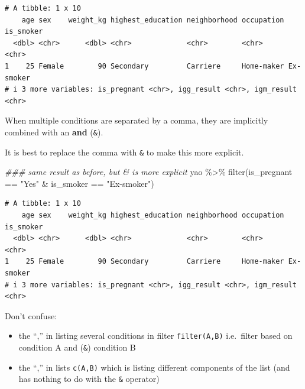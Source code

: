 \documentclass[
  letterpaper,
  DIV=11,
  numbers=noendperiod]{scrreprt}
\newenvironment{Shaded}{\begin{snugshade}}{\end{snugshade}}
\newcommand{\DocumentationTok}[1]{\textcolor[rgb]{0.37,0.37,0.37}{\textit{#1}}}
\newcommand{\FunctionTok}[1]{\textcolor[rgb]{0.28,0.35,0.67}{#1}}
\newcommand{\NormalTok}[1]{\textcolor[rgb]{0.00,0.23,0.31}{#1}}
\newcommand{\SpecialCharTok}[1]{\textcolor[rgb]{0.37,0.37,0.37}{#1}}
\newcommand{\StringTok}[1]{\textcolor[rgb]{0.13,0.47,0.30}{#1}}
\begin{document}
\begin{verbatim}
# A tibble: 1 x 10
    age sex    weight_kg highest_education neighborhood occupation is_smoker
  <dbl> <chr>      <dbl> <chr>             <chr>        <chr>      <chr>    
1    25 Female        90 Secondary         Carriere     Home-maker Ex-smoker
# i 3 more variables: is_pregnant <chr>, igg_result <chr>, igm_result <chr>
\end{verbatim}

When multiple conditions are separated by a comma, they are implicitly
combined with an \textbf{and} (\texttt{\&}).

It is best to replace the comma with \texttt{\&} to make this more
explicit.

\begin{Shaded}
\begin{Highlighting}[]
\DocumentationTok{\#\#\# same result as before, but \textasciigrave{}\&\textasciigrave{} is more explicit}
\NormalTok{yao }\SpecialCharTok{\%\textgreater{}\%} \FunctionTok{filter}\NormalTok{(is\_pregnant }\SpecialCharTok{==} \StringTok{"Yes"} \SpecialCharTok{\&}\NormalTok{ is\_smoker }\SpecialCharTok{==} \StringTok{"Ex{-}smoker"}\NormalTok{)}
\end{Highlighting}
\end{Shaded}

\begin{verbatim}
# A tibble: 1 x 10
    age sex    weight_kg highest_education neighborhood occupation is_smoker
  <dbl> <chr>      <dbl> <chr>             <chr>        <chr>      <chr>    
1    25 Female        90 Secondary         Carriere     Home-maker Ex-smoker
# i 3 more variables: is_pregnant <chr>, igg_result <chr>, igm_result <chr>
\end{verbatim}

\begin{tcolorbox}[enhanced jigsaw, colframe=quarto-callout-note-color-frame, rightrule=.15mm, opacityback=0, breakable, coltitle=black, colbacktitle=quarto-callout-note-color!10!white, bottomrule=.15mm, leftrule=.75mm, toprule=.15mm, arc=.35mm, bottomtitle=1mm, colback=white, left=2mm, opacitybacktitle=0.6, titlerule=0mm, title=\textcolor{quarto-callout-note-color}{\faInfo}\hspace{0.5em}{Side Note}, toptitle=1mm]

Don't confuse:

\begin{itemize}
\item
  the ``,'' in listing several conditions in filter \texttt{filter(A,B)}
  i.e.~filter based on condition A and (\texttt{\&}) condition B
\item
  the ``,'' in lists \texttt{c(A,B)} which is listing different
  components of the list (and has nothing to do with the \texttt{\&}
  operator)
\end{itemize}

\end{tcolorbox}
\end{document}
